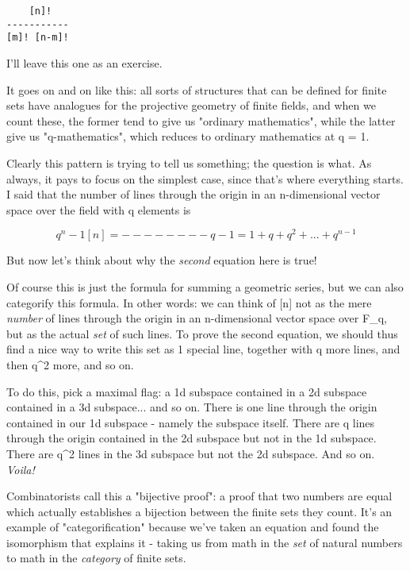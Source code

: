 \begin{verbatim}
    [n]! 
-----------
[m]! [n-m]!
\end{verbatim}
    
I'll leave this one as an exercise.

It goes on and on like this: all sorts of structures that can
be defined for finite sets have analogues for the projective
geometry of finite fields, and when we count these, the former
tend to give us "ordinary mathematics", while the latter give
us "q-mathematics", which reduces to ordinary mathematics at q = 1.

Clearly this pattern is trying to tell us something; the question 
is what.  As always, it pays to focus on the simplest case, since
that's where everything starts.  I said that the number of lines
through the origin in an n-dimensional vector space over the field
with q elements is

$$
           q^{n} - 1
  [n]  =   --------   
            q - 1

       = 1 + q + q^{2} + ... + q^{n-1}
$$
    
But now let's think about why the \emph{second} equation here is true!  


Of course this is just the formula for summing a geometric series, but
we can also categorify this formula.  In other words: we can think of
[n] not as the mere \emph{number} of lines through the origin in an
n-dimensional vector space over F_{q}, but as the actual
\emph{set} of such lines.  To prove the second equation, we should
thus find a nice way to write this set as 1 special line, together with
q more lines, and then q^{2} more, and so on.

To do this, pick a maximal flag: a 1d subspace contained in a 2d
subspace contained in a 3d subspace... and so on.   There is one line
through the origin contained in our 1d subspace - namely the subspace
itself.   There are q lines through the origin contained in the 2d
subspace but not in the 1d subspace.  There are q^{2} lines in the 3d
subspace but not the 2d subspace.  And so on.  \emph{Voila!}

Combinatorists call this a "bijective proof": a proof that two
numbers are equal which actually establishes a bijection between the
finite sets they count.  It's an example of "categorification"
because we've taken an equation and found the isomorphism that explains
it - taking us from math in the \emph{set} of natural numbers to math in the
\emph{category} of finite sets.

